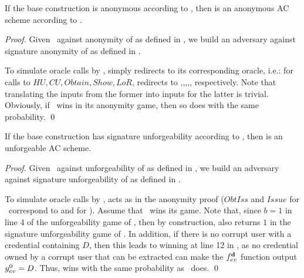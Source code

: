 \begin{theorem}
  \label{thm:anon-cuasac}
  If the base \CUASGen construction is anonymous according to
  , then \CUASAC is an anonymous AC scheme
  according to \cite{fhs19}.
\end{theorem}

\begin{proof}
  Given \adv~against anonymity of \CUASAC as defined in \cite{fhs19}, we build
  an adversary \advB against signature anonymity of \CUASGen as defined
  in .

  To simulate oracle calls by \adv, \advB simply redirects to its corresponding
  oracle, i.e.: for calls to $HU,CU,Obtain,Show,LoR$, \advB redirects to
  \HUGEN,\CUGEN,\OBTAIN,\SIGN,\CHALb, respectively. Note that translating
  the inputs from the former into inputs for the latter is trivial.
  Obviously, if \adv~wins in its anonymity game, then so does \advB with the
  same probability.
  \qed
\end{proof}

\begin{theorem}
  \label{thm:forge-cuasac}
  If the base \CUASGen construction has signature unforgeability according to
  , then \CUASAC is an unforgeable AC scheme.
\end{theorem}

\begin{proof}
  Given \adv~against unforgeability of \CUASAC as defined in \cite{fhs19}, we
  build an adversary \advB against signature unforgeability of \CUASGen as
  defined in .

  To simulate oracle calls by \adv, \advB acts as in the anonymity proof
  ($ObtIss$ and $Issue$ for \adv~correspond to \OBTISS and \ISSUE for \advB).
  Assume that \adv~wins its game. Note that, since $b=1$ in line 4 of the
  unforgeability game of , then by construction, \Verify
  also returns $1$ in the signature unforgeability game of \UAS. In addition, if
  there is no corrupt user with a credential containing $D$, then this leads to
  \advB winning at line 12 in , as no credential
  owned by a corrupt user that can be extracted can make the $f_{ev}^{\mathbf{d}}$
  function output $y_{ev}^0=D$. Thus, \advB wins with the same probability as
  \adv~does.  
  \qed
\end{proof}

